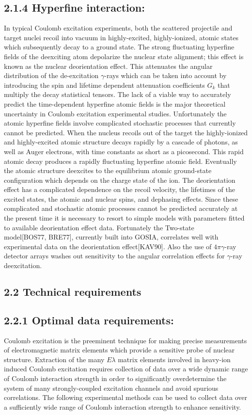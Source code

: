 \documentclass[10pt]{article}
\begin{document}
\subsection*{2.1.4 Hyperfine interaction:}
In typical Coulomb excitation experiments, both the scattered projectile and target nuclei recoil into vacuum in highly-excited, highly-ionized, atomic states which subsequently decay to a ground state. The strong fluctuating hyperfine fields of the deexciting atom depolarize the nuclear state alignment; this effect is known as the nuclear deorientation effect. This attenuates the angular distribution of the de-excitation $\gamma$-rays which can be taken into account by introducing the spin and lifetime dependent attenuation coefficients $G_{k}$ that multiply the decay statistical tensors. The lack of a viable way to accurately predict the time-dependent hyperfine atomic fields is the major theoretical uncertainty in Coulomb excitation experimental studies. Unfortunately the atomic hyperfine fields involve complicated stochastic processes that currently cannot be predicted. When the nucleus recoils out of the target the highly-ionized and highly-excited atomic structure decays rapidly by a cascade of photons, as well as Auger electrons, with time constants as short as a picosecond. This rapid atomic decay produces a rapidly fluctuating hyperfine atomic field. Eventually the atomic structure deexcites to the equilibrium atomic ground-state configuration which depends on the charge state of the ion. The deorientation effect has a complicated dependence on the recoil velocity, the lifetimes of the excited states, the atomic and nuclear spins, and dephasing effects. Since these complicated and stochastic atomic processes cannot be predicted accurately at the present time it is necessary to resort to simple models with parameters fitted to available deorientation effect data. Fortunately the Two-state\\[0pt]
model[BOS77, BRE77], currently built into GOSIA, correlates well with experimental data on the deorientation effect[KAV90]. Also the use of $4 \pi \gamma$-ray detector arrays washes out sensitivity to the angular correlation effects for $\gamma$-ray deexcitation.

\subsection*{2.2 Technical requirements}
\subsection*{2.2.1 Optimal data requirements:}
Coulomb excitation is the preeminent technique for making precise measurements of electromagnetic matrix elements which provide a sensitive probe of nuclear structure. Extraction of the many $E \lambda$ matrix elements involved in heavy-ion induced Coulomb excitation requires collection of data over a wide dynamic range of Coulomb interaction strength in order to significantly overdetermine the system of many strongly-coupled excitation channels and avoid spurious correlations. The following experimental methods can be used to collect data over a sufficiently wide range of Coulomb interaction strength to enhance sensitivity.
\end{document}
